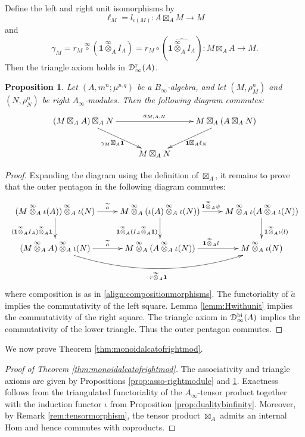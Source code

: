 \documentclass[a4paper, 11pt]{amsart}
\newtheorem{prop}[thm]{Proposition}
\theoremstyle{definition}
\theoremstyle{remark}
\numberwithin{equation}{section}
\newcommand{\RR}{\mathrm{r}}
\newcommand{\BB}{\mathrm{bi}}
\newcommand{\id}{\mathbf{1}}
\newcommand{\ED}{\EuScript{D}}
\begin{document}
Define the left and right unit isomorphisms by
\[
\ell_M= l_{\iota(M)} \colon A \boxtimes_A M \to M
\]
and
\[
\gamma_M= r_M\overset{\infty}{\circ} (\id\overset{\infty}{\otimes}_A I_A)=r_M\circ(\widehat{\id\overset{\infty}{\otimes}_A I_A}) \colon M \boxtimes_A A \to M.
\]
Then the triangle axiom holds in $\ED^{\RR}_{\infty}(A)$.

\begin{prop}\label{prop:triangle-rightmodule}
Let $(A,m^n;\mu^{p,q})$ be a $B_{\infty}$-algebra, and let $(M,\rho^n_M)$ and $(N,\rho^n_N)$ be right $A_{\infty}$-modules. Then the following diagram commutes:
$$
\xymatrix{
(M\boxtimes_A A)\boxtimes_A N \ar[rr]^{a_{M,A,N}}\ar[rd]_{\gamma_M\boxtimes_A \id}& & M\boxtimes_A (A\boxtimes_A N) \ar[ld]^{\id\boxtimes_A\ell_N}\\
 & M\boxtimes_A N &
 }
$$
\end{prop}
\begin{proof}
Expanding the diagram using the definition of $\boxtimes_A$, it remains to prove that the outer pentagon in the following diagram commutes:
$$\xymatrix{
(M\overset{\infty}{\otimes}_A \iota(A))\overset{\infty}{\otimes}_A \iota(N) \ar[r]^{\widetilde a}\ar[d]_{(\id\overset{\infty}{\otimes}_A I_A)\overset{\infty}{\otimes}_A\id}& M\overset{\infty}{\otimes}_A (\iota(A)\overset{\infty}{\otimes}_A \iota(N))\ar[r]^{\id\overset{\infty}{\otimes}_A\psi}\ar[d]_{\id\overset{\infty}{\otimes}_A (I_A\overset{\infty}{\otimes}_A\id)} & M\overset{\infty}{\otimes}_A \iota(A\overset{\infty}{\otimes}_A \iota(N))\ar[d]^{\id\overset{\infty}{\otimes}_A\iota(l)} \\
(M\overset{\infty}{\otimes}_A A)\overset{\infty}{\otimes}_A\iota(N)\ar[r]^{\widetilde a} \ar@/_2pc/
[rr]_{r\overset{\infty}{\otimes}_A \id}& M\overset{\infty}{\otimes}_A (A\overset{\infty}{\otimes}_A \iota(N))\ar[r]^{\id\overset{\infty}{\otimes}_A l}& M\overset{\infty}{\otimes}_A \iota(N)
 }$$
where composition is as in \eqref{align:compositionmorphisms}.
The functoriality of $\widetilde a$ implies the commutativity of the left square. Lemma \ref{lemm:Hwithunit} implies the commutativity of the right square. The triangle axiom in $\ED^{\BB}_{\infty}(A)$ implies the commutativity of the lower triangle.
Thus the outer pentagon commutes.
\end{proof}


We now prove Theorem \ref{thm:monoidalcatofrightmod}.
\begin{proof}[Proof of Theorem \ref{thm:monoidalcatofrightmod}]
The associativity and triangle axioms are given by Propositions \ref{prop:asso-rightmodule} and \ref{prop:triangle-rightmodule}. Exactness follows from the triangulated functoriality of the $A_\infty$-tensor product together with the induction functor $\iota$ from Proposition \ref{prop:dualitybinfinity}. Moreover, by Remark \ref{rem:tensormorphism}, the tensor product $\boxtimes_A$ admits an internal Hom and hence commutes with coproducts.
\end{proof}
\end{document}
